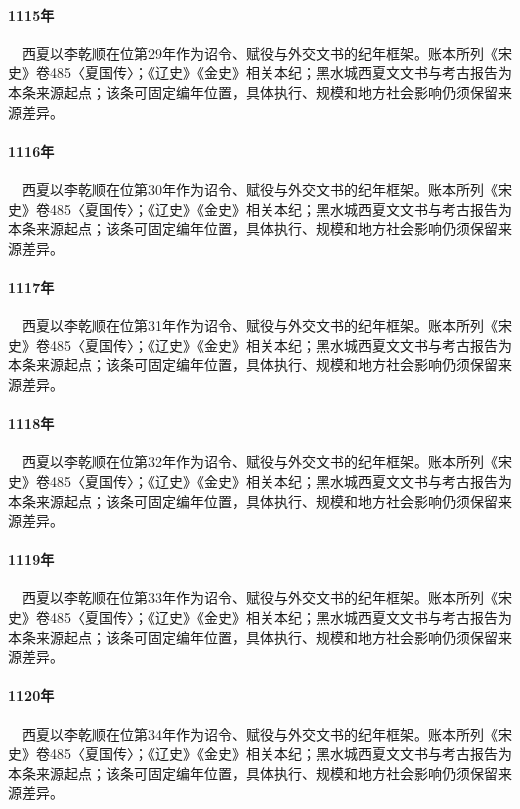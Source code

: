 \paragraph{1115年}　西夏以李乾顺在位第29年作为诏令、赋役与外交文书的纪年框架。账本所列《宋史》卷485〈夏国传〉；《辽史》《金史》相关本纪；黑水城西夏文文书与考古报告为本条来源起点；该条可固定编年位置，具体执行、规模和地方社会影响仍须保留来源差异。

\paragraph{1116年}　西夏以李乾顺在位第30年作为诏令、赋役与外交文书的纪年框架。账本所列《宋史》卷485〈夏国传〉；《辽史》《金史》相关本纪；黑水城西夏文文书与考古报告为本条来源起点；该条可固定编年位置，具体执行、规模和地方社会影响仍须保留来源差异。

\paragraph{1117年}　西夏以李乾顺在位第31年作为诏令、赋役与外交文书的纪年框架。账本所列《宋史》卷485〈夏国传〉；《辽史》《金史》相关本纪；黑水城西夏文文书与考古报告为本条来源起点；该条可固定编年位置，具体执行、规模和地方社会影响仍须保留来源差异。

\paragraph{1118年}　西夏以李乾顺在位第32年作为诏令、赋役与外交文书的纪年框架。账本所列《宋史》卷485〈夏国传〉；《辽史》《金史》相关本纪；黑水城西夏文文书与考古报告为本条来源起点；该条可固定编年位置，具体执行、规模和地方社会影响仍须保留来源差异。

\paragraph{1119年}　西夏以李乾顺在位第33年作为诏令、赋役与外交文书的纪年框架。账本所列《宋史》卷485〈夏国传〉；《辽史》《金史》相关本纪；黑水城西夏文文书与考古报告为本条来源起点；该条可固定编年位置，具体执行、规模和地方社会影响仍须保留来源差异。

\paragraph{1120年}　西夏以李乾顺在位第34年作为诏令、赋役与外交文书的纪年框架。账本所列《宋史》卷485〈夏国传〉；《辽史》《金史》相关本纪；黑水城西夏文文书与考古报告为本条来源起点；该条可固定编年位置，具体执行、规模和地方社会影响仍须保留来源差异。

